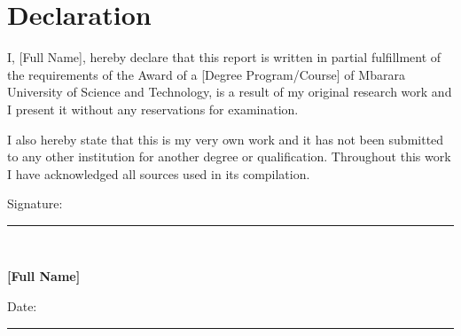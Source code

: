 \chapter*{Declaration}

\vspace{1mm}

\par\vspace{1mm}
I, [Full Name], hereby declare that this report is written in partial fulfillment of the
requirements of the Award of a [Degree Program/Course] of Mbarara University of
Science and Technology, is a result of my original research work and I present it without any reservations for examination.

I also hereby state that this is my very own work and it has not
been submitted to any other institution for another degree or qualification. Throughout this work I
have acknowledged all sources used in its compilation. 

\vspace{20mm}

Signature:  \rule{50mm}{0.5pt}\\
\par\vspace{10mm}
\textbf{[Full Name]}
\par\vspace{10mm}
Date: \rule{50mm}{0.5pt}\\
